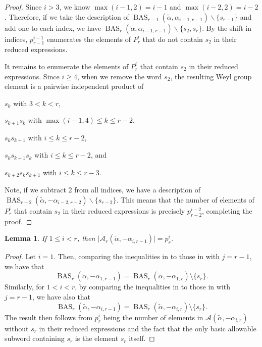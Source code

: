 \documentclass{amsart}
\newtheorem{lemma}[theorem]{Lemma}
\theoremstyle{definition}
\DeclareMathOperator{\BAS}{BAS}
\newcommand{\hroot}{\tilde{\alpha}}
\newcommand{\calA}{\mathcal{A}}
\begin{document}
\begin{proof}
Since $i > 3$, we know $\max(i-1,2) = i-1$ and $\max(i-2,2) = i-2$. Therefore, if we take the description of $\BAS_{r-1}(\hroot,\alpha_{i-1,r-1})\backslash\{s_{r-1}\}$ and add one to each index, we have $\BAS_{r}(\hroot,\alpha_{i-1,r-1})\backslash\{s_2,s_r\}$. 
By the shift in indices, $p_{r-1}^{i-1}$ enumerates the elements of $P_r^i$ 
that do not contain $s_2$ in their reduced expressions.

It remains to enumerate the elements of $P_r^i$ that contain  $s_2$ in their reduced expressions.
Since $i \geq 4$, when we remove the word $s_2$, the resulting Weyl group element is a pairwise independent product of  \begin{enumerate}
\noindent \begin{minipage}{0.45\textwidth}
    \item[(a)] $s_k$ with $3 < k < r$,
    \item[(b)] $s_{k+1}s_k$ with $\max(i-1,4) \leq k \leq r-2$,
    \item[(c)] $s_ks_{k+1}$ with $i \leq k \leq r-2$,
\end{minipage}
\begin{minipage}{0.45\textwidth}
    \item[(d)] $s_ks_{k+1}s_k$ with $i \leq k \leq r-2$, and 
    \item[(e)] $s_{k+2}s_ks_{k+1}$ with $i \leq k \leq r-3$.
\end{minipage}
\end{enumerate}
Note, if we subtract 2 from all indices, we have a description of $\BAS_{r-2}(\hroot,-\alpha_{i-2,r-2})\backslash\{s_{r-2}\}$. This means that the number of elements of $P_r^i$  that contain  $s_2$ in their reduced expressions is precisely $p_{r-2}^{i-2}$, completing the proof.
\end{proof}



\begin{lemma}
    If $1\leq i< r$, then $\vert\calA_r(\hroot,-\alpha_{i,r-1})\vert=p_r^i$.
\end{lemma}

\begin{proof}
    Let $i=1$. Then, comparing the inequalities in  to those in  with $j=r-1$, we have that \[\BAS_r(\hroot,-\alpha_{1,r-1})=\BAS_r(\hroot,{-}\alpha_{1,r})\setminus\{s_r\}.\] Similarly, for $1<i<r$, by comparing the inequalities in  to those in  with $j=r-1$, we have also that \[\BAS_r(\hroot,-\alpha_{i,r-1})=\BAS_r(\hroot,{-}\alpha_{i,r})\setminus\{s_r\}.\]
    The result then follows from $p_r^i$ being the number of  elements in $\calA(\hroot,-\alpha_{i,r})$ without $s_r$ in their reduced expressions and the fact that the only basic allowable subword containing $s_r$ is the element $s_r$ itself.
\end{proof}
\end{document}
